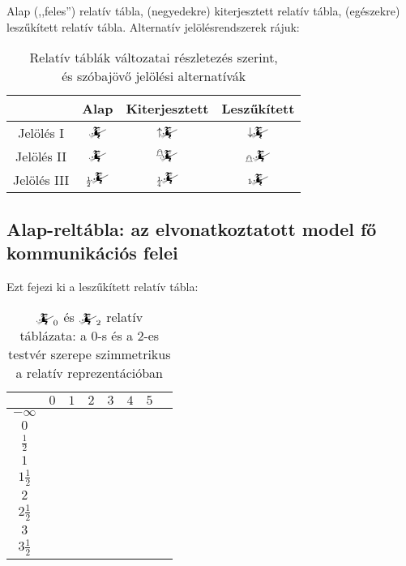 \documentclass{article}
\newcommand{\blk}{\cellcolor{darkgray}}
\newcommand{\red}{\cellcolor{red!33}}
\newcommand{\grn}{\cellcolor{green!33}}
\newcommand{\nothing}{\text{\raisebox{0.4em}{\rotatebox{180}{$\curvearrowleft$}}}}%
\newcommand{\just}[1]{\boxed{#1}}%
\newcommand{\incl}{\mathbf{incl}}
\newcommand{\excl}{\mathbf{excl}}
\newcommand{\currymainfun}[1]{\mathwitch_{#1}}
\begin{document}
	Alap (,,feles'') relatív tábla, (negyedekre) kiterjesztett relatív tábla, (egészekre) leszűkített relatív tábla. Alternatív jelölésrendszerek rájuk:
	\begin{table}[H]
		\caption*{Relatív táblák változatai részletezés szerint,\\és szóbajövő jelölési alternatívák}
		\centering
		\begin{tabular}{c|ccc}
			             &  Alap                             &  Kiterjesztett                     &  Leszűkített\\\hline\hline
			Jelölés I    &  $\currymainfun{}$                &  $\uparrow\!\!\!\currymainfun{}$       &  $\downarrow\!\!\!\currymainfun{}$\\\hline
			Jelölés II   &  $\currymainfun{}$                &  ${}^{\mathghost}\!\!\!\currymainfun{}$  &  ${}_{\mathghost}\!\currymainfun{}$\\\hline
			Jelölés III  &  ${}_{\frac12}\!\!\currymainfun{}$  &  ${}_{\frac14}\!\!\currymainfun{}$   &  ${}_1\!\!\currymainfun{}$
		\end{tabular}
	\end{table}

	\subsection{Alap-reltábla: az elvonatkoztatott model fő kommunikációs felei}

	Ezt fejezi ki a leszűkített relatív tábla:

	\begin{table}[H]
		\caption*{$\currymainfun0$ és $\currymainfun2$ relatív táblázata: a 0-s és a 2-es testvér szerepe szimmetrikus a relatív reprezentációban}
		\centering
		\begin{tabular}{c||c|c|c|c|c|c|c|}
				&	$0$		&	$1$		&	$2$		&	$3$		&	$4$		&	$5$		\\\hline\hline
		$-\infty$	&	\nothing	&	\nothing	&	\nothing	&	\nothing	&	\nothing	&	\nothing	\\\hline
			$0$	&	\nothing	&	\nothing	&	\nothing	&	\nothing	&	\nothing	&	\grn\just\incl	\\\hline
		$\frac12$	&	\red\just\excl	&	\nothing	&	\nothing	&	\nothing	&	\nothing	&	\grn\just\incl	\\\hline
			$1$	&	\red\just\excl	&	\nothing	&	\nothing	&	\nothing	&	\grn\just\incl	&	\blk		\\\hline
		$1\frac12$	&	\blk		&	\red\just\excl	&	\nothing	&	\nothing	&	\grn\just\incl	&	\blk		\\\hline
			$2$	&	\blk		&	\red\just\excl	&	\nothing	&	\grn\just\incl	&	\blk		&	\blk		\\\hline
		$2\frac12$	&	\blk		&	\blk		&	\red\just\excl	&	\grn\just\incl	&	\blk		&	\blk		\\\hline
			$3$	&	\blk		&	\blk		&	\blk		&	\blk		&	\blk		&	\blk		\\\hline
		$3\frac12$	&	\blk		&	\blk		&	\blk		&	\blk		&	\blk		&	\blk		\\\hline
		\end{tabular}
	\end{table}
\end{document}
